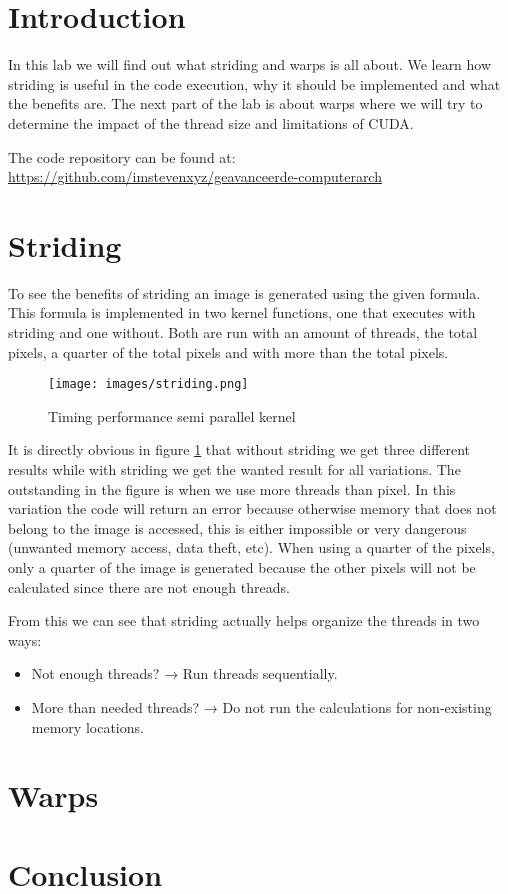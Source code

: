 
\section{Introduction}
\label{sec:introduction}
In this lab we will find out what striding and warps is all about. We learn how striding is useful in the code execution, why it should be implemented and what the benefits are. The next part of the lab is about warps where we will try to determine the impact of the thread size and limitations of CUDA.

The code repository can be found at: \\
\url{https://github.com/imstevenxyz/geavanceerde-computerarch}

\section{Striding}
\label{sec:striding}

To see the benefits of striding an image is generated using the given formula. This formula is implemented in two kernel functions, one that executes with striding and one without. Both are run with an amount of threads, the total pixels, a quarter of the total pixels and with more than the total pixels.

\begin{figure}[H]
    \centering
    \texttt{[image: images/striding.png]}
    \caption{Timing performance semi parallel kernel}
    \label{figure:striding}
\end{figure}

It is directly obvious in figure \ref{figure:striding} that without striding we get three different results while with striding we get the wanted result for all variations. The outstanding in the figure is when we use more threads than pixel. In this variation the code will return an error because otherwise memory that does not belong to the image is accessed, this is either impossible or very dangerous (unwanted memory access, data theft, etc). When using a quarter of the pixels, only a quarter of the image is generated because the other pixels will not be calculated since there are not enough threads.

From this we can see that striding actually helps organize the threads in two ways:
\begin{itemize}
    \item Not enough threads? → Run threads sequentially.
    \item More than needed threads? → Do not run the calculations for non-existing memory locations.
\end{itemize}

\section{Warps}
\label{sec:warps}

\section{Conclusion}
\label{sec:conclusion}

